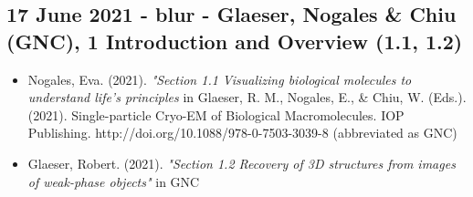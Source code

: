 \documentclass[11pt, oneside]{article}   	%
\begin{document}
\subsection{17 June 2021 - blur - Glaeser, Nogales \& Chiu (GNC), 1 Introduction and Overview (1.1, 1.2)}
\begin{itemize}
	\item Nogales, Eva. (2021). {\it "Section 1.1 Visualizing biological molecules to understand life's principles} in Glaeser, R. M., Nogales, E., \& Chiu, W. (Eds.). (2021). Single-particle Cryo-EM of Biological Macromolecules. IOP Publishing. http://doi.org/10.1088/978-0-7503-3039-8 (abbreviated as GNC)
	\item Glaeser, Robert. (2021). {\it "Section 1.2 Recovery of 3D structures from images of weak-phase objects"} in GNC
\end{itemize}
\end{document}
